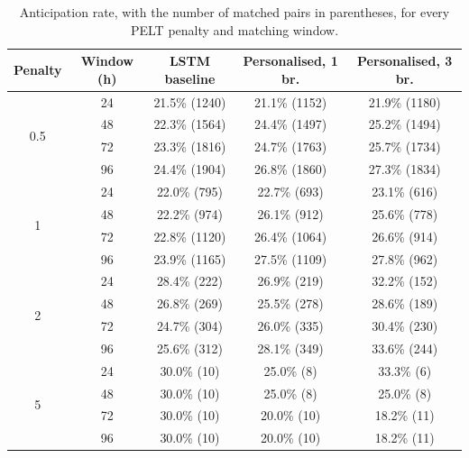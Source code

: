 \documentclass[preprint,12pt,authoryear]{elsarticle}
\begin{document}
\begin{table}[h]
\centering
\caption{Anticipation rate, with the number of matched pairs in
parentheses, for every PELT penalty and matching window.}
\label{tab:grid}
\small
\begin{tabular}{ccccc}
\toprule
Penalty & Window (h) & LSTM baseline & Personalised, 1 br. & Personalised, 3 br. \\
\midrule
\multirow{4}{*}{0.5} & 24 & 21.5\% (1240) & 21.1\% (1152) & 21.9\% (1180) \\
 & 48 & 22.3\% (1564) & 24.4\% (1497) & 25.2\% (1494) \\
 & 72 & 23.3\% (1816) & 24.7\% (1763) & 25.7\% (1734) \\
 & 96 & 24.4\% (1904) & 26.8\% (1860) & 27.3\% (1834) \\
\midrule
\multirow{4}{*}{1} & 24 & 22.0\% (795) & 22.7\% (693) & 23.1\% (616) \\
 & 48 & 22.2\% (974) & 26.1\% (912) & 25.6\% (778) \\
 & 72 & 22.8\% (1120) & 26.4\% (1064) & 26.6\% (914) \\
 & 96 & 23.9\% (1165) & 27.5\% (1109) & 27.8\% (962) \\
\midrule
\multirow{4}{*}{2} & 24 & 28.4\% (222) & 26.9\% (219) & 32.2\% (152) \\
 & 48 & 26.8\% (269) & 25.5\% (278) & 28.6\% (189) \\
 & 72 & 24.7\% (304) & 26.0\% (335) & 30.4\% (230) \\
 & 96 & 25.6\% (312) & 28.1\% (349) & 33.6\% (244) \\
\midrule
\multirow{4}{*}{5} & 24 & 30.0\% (10) & 25.0\% (8) & 33.3\% (6) \\
 & 48 & 30.0\% (10) & 25.0\% (8) & 25.0\% (8) \\
 & 72 & 30.0\% (10) & 20.0\% (10) & 18.2\% (11) \\
 & 96 & 30.0\% (10) & 20.0\% (10) & 18.2\% (11) \\
\bottomrule
\end{tabular}
\end{table}
\end{document}
